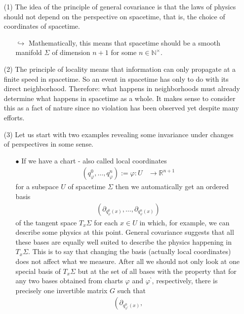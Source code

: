 \begin{enumerate}
\item[(1)]
The idea of the principle of general covariance is that the laws of physics should not depend on the perspective on spacetime, that is, the choice of coordinates of spacetime.
\begin{enumerate}
\item[$\pmb{\hookrightarrow}$]
Mathematically, this means that spacetime should be a smooth manifold $\Sigma$ of dimension $n+1$ for some $n \in \mathbb{N}^{\times}$.
\end{enumerate}
\item[(2)]
The principle of locality means that information can only propagate at a finite speed in spacetime. So an event in spacetime has only to do with its direct neighborhood. Therefore: what happens in neighborhoods must already determine what happens in spacetime as a whole. It makes sense to consider this as a fact of nature since no violation has been observed yet despite many efforts.
\item[(3)]
Let us start with two examples revealing some invariance under changes of perspectives in some sense.
\begin{enumerate}
\item[$\bullet$]
If we have a chart - also called local coordinates
\begin{align*}
  \left(
    q_{\varphi}^{0},
    \ldots,
    q_{\varphi}^{n}
  \right)
  :=
  \varphi
  \colon
  U
  &\rightarrow
  \mathbb{R}^{n+1}
\end{align*}
for a subspace $U$ of spacetime $\Sigma$ then we automatically get an ordered basis
\begin{align*}
  \left(
    \partial_{q_{\varphi}^{0}(x)},
    \ldots,
    \partial_{q_{\varphi}^{n}(x)}
  \right)
\end{align*}
of the tangent space $T_{x}\Sigma$ for each $x \in U$ in which, for example, we can describe some physics at this point. General covariance suggests that all these bases are equally well suited to describe the physics happening in $T_{x}\Sigma$. This is to say that changing the basis (actually local coordinates) does not affect what we measure. After all we should not only look at one special basis of $T_{x}\Sigma$ but at the set of all bases with the property that for any two bases obtained from charts $\varphi$ and $\varphi^{\backprime}$, respectively, there is precisely one invertible matrix $G$ such that
\begin{align*}
  \left(
    \partial_{q_{\varphi^{\backprime}}^{0}(x)},

\end{align*}
\end{enumerate}
\end{enumerate}
